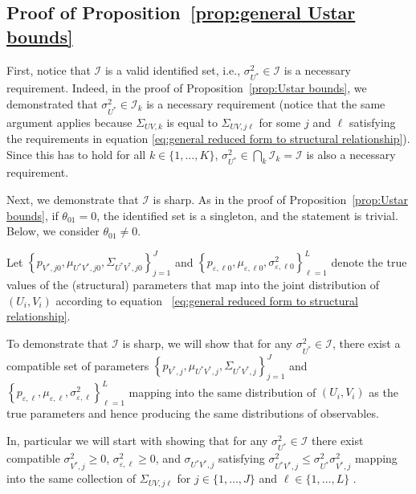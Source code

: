 \documentclass[12pt]{article}
\begin{document}
\begin{appendices}
\subsection{Proof of Proposition~\protect\ref{prop:general Ustar bounds}}

First, notice that $\mathcal{I}$ is a valid identified set, i.e., $%
\sigma_{U^*}^2 \in \mathcal{I}$ is a necessary requirement. Indeed, in the
proof of Proposition~\ref{prop:Ustar bounds}, we demonstrated that $%
\sigma_{U^*}^2 \in \mathcal{I}_{k}$ is a necessary requirement (notice that
the same argument applies because $\Sigma_{UV,k}$ is equal to $\Sigma_{UV,j
\ell}$ for some $j$ and $\ell$ satisfying the requirements in equation %
\eqref{eq:general reduced form to structural relationship}). Since this has
to hold for all $k \in \{1, \ldots, K\}$, $\sigma_{U^*}^2 \in \bigcap_{k} 
\mathcal{I}_{k} = \mathcal{I} $ is also a necessary requirement.

Next, we demonstrate that $\mathcal{I}$ is sharp. As in the proof of
Proposition~\ref{prop:Ustar bounds}, if $\theta _{01}=0$, the identified set
is a singleton, and the statement is trivial. Below, we consider $\theta
_{01}\neq 0$.

Let $\left\{ p_{V^*,j0},\mu _{U^{\ast } V^*,j0},\Sigma _{U^{\ast
}V^*,j0}\right\} _{j=1}^{J}$ and $\left\{ p_{\varepsilon, \ell 0},\mu
_{\varepsilon ,\ell 0},\sigma _{\varepsilon ,\ell 0}^{2}\right\} _{\ell
=1}^{L}$ denote the true values of the (structural) parameters that map into
the joint distribution of $(U_i,V_i)$ according to equation~%
\eqref{eq:general reduced
form to structural relationship}.

To demonstrate that $\mathcal{I}$ is sharp, we will show that for any $%
\sigma _{U^{\ast }}^{2}\in \mathcal{I}$, there exist a compatible set of
parameters $\left\{ p_{V^*,j},\mu _{U^{\ast } V^*,j},\Sigma _{U^{\ast
}V^*,j}\right\} _{j=1}^{J}$ and $\left\{ p_{\varepsilon, \ell},\mu
_{\varepsilon ,\ell},\sigma _{\varepsilon ,\ell}^{2}\right\} _{\ell =1}^{L}$
mapping into the same distribution of $(U_i,V_i)$ as the true parameters and
hence producing the same distributions of observables.

In, particular we will start with showing that for any $\sigma _{U^{\ast
}}^{2}\in \mathcal{I}$ there exist compatible $\sigma _{V^{\ast },j}^{2}\geq
0$, $\sigma _{\varepsilon ,\ell }^{2}\geq 0$, and $\sigma _{U^{\ast }V^{\ast
},j}$ satisfying $\sigma _{U^{\ast }V^{\ast },j}^{2}\leq \sigma _{U^{\ast
}}^{2}\sigma _{V^{\ast },j}^{2}$ mapping into the same collection of $%
\Sigma_{UV,j \ell}$ for $j\in \{1,\ldots ,J\}$ and $\ell \in \{1,\ldots ,L\}$%
.


\end{appendices}
\end{document}
